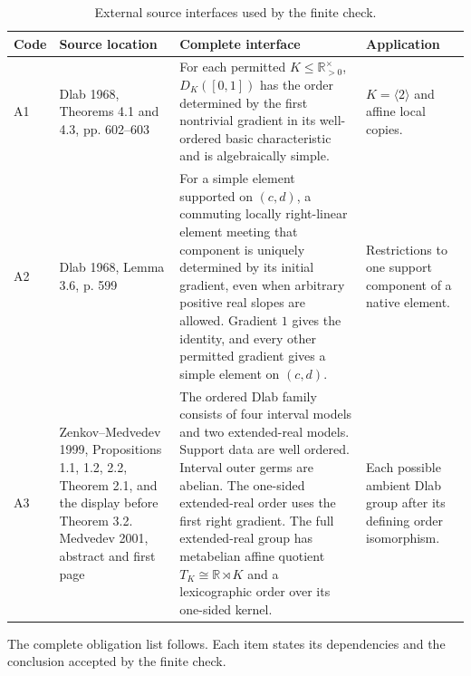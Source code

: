 \documentclass[11pt]{amsart}
\theoremstyle{definition}
\theoremstyle{remark}
\numberwithin{equation}{section}
\begin{document}
\begin{table}[t]
\centering
\scriptsize
\caption{External source interfaces used by the finite check.}
\label{tab:source-data}
\begin{tabular}{@{}p{}p{}p{}p{}@{}}
\toprule
Code & Source location & Complete interface & Application \\
\midrule
A1 & Dlab 1968, Theorems 4.1 and 4.3, pp. 602--603 & For each permitted \(K\leq\mathbb R_{>0}^{\times}\), \(D_K([0,1])\) has the order determined by the first nontrivial gradient in its well-ordered basic characteristic and is algebraically simple. & \(K=\langle2\rangle\) and affine local copies. \\
A2 & Dlab 1968, Lemma 3.6, p. 599 & For a simple element supported on \((c,d)\), a commuting locally right-linear element meeting that component is uniquely determined by its initial gradient, even when arbitrary positive real slopes are allowed. Gradient \(1\) gives the identity, and every other permitted gradient gives a simple element on \((c,d)\). & Restrictions to one support component of a native element. \\
A3 & Zenkov--Medvedev 1999, Propositions 1.1, 1.2, 2.2, Theorem 2.1, and the display before Theorem 3.2. Medvedev 2001, abstract and first page & The ordered Dlab family consists of four interval models and two extended-real models. Support data are well ordered. Interval outer germs are abelian. The one-sided extended-real order uses the first right gradient. The full extended-real group has metabelian affine quotient \(T_K\cong\mathbb R\rtimes K\) and a lexicographic order over its one-sided kernel. & Each possible ambient Dlab group after its defining order isomorphism. \\
\bottomrule
\end{tabular}
\end{table}

The complete obligation list follows. Each item states its dependencies and the conclusion accepted by the finite check.
\end{document}
